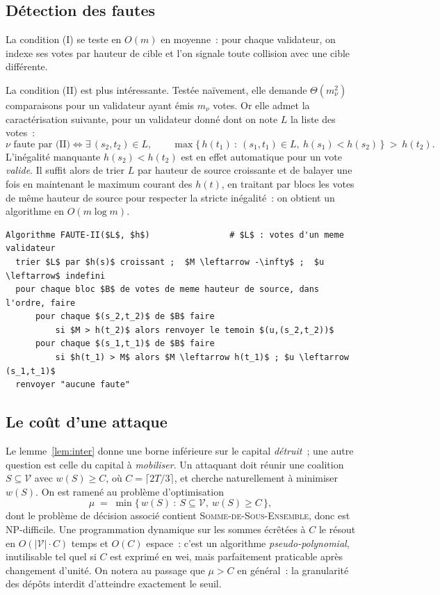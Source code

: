 \documentclass[11pt,a4paper]{article}
\theoremstyle{plain}
\theoremstyle{definition}
\newcommand{\Vv}{\mathcal{V}}
\begin{document}
\subsection{Détection des fautes}

La condition (I) se teste en $O(m)$ en moyenne~: pour chaque validateur, on indexe ses votes
par hauteur de cible et l'on signale toute collision avec une cible différente.

La condition (II) est plus intéressante. Testée naïvement, elle demande $\Theta(m_\nu^2)$
comparaisons pour un validateur ayant émis $m_\nu$ votes. Or elle admet la caractérisation
suivante, pour un validateur donné dont on note $L$ la liste des votes~:
\[ \nu \text{ faute par (II)} \iff \exists\,(s_2,t_2)\in L,\qquad
\max\big\{\,h(t_1)\ :\ (s_1,t_1)\in L,\ h(s_1)<h(s_2)\,\big\}\ >\ h(t_2). \]
L'inégalité manquante $h(s_2)<h(t_2)$ est en effet automatique pour un vote \emph{valide}.
Il suffit alors de trier $L$ par hauteur de source croissante et de balayer une fois en
maintenant le maximum courant des $h(t)$, en traitant par blocs les votes de même hauteur de
source pour respecter la stricte inégalité~: on obtient un algorithme en $O(m\log m)$.

\begin{lstlisting}
Algorithme FAUTE-II($L$, $h$)                # $L$ : votes d'un meme validateur
  trier $L$ par $h(s)$ croissant ;  $M \leftarrow -\infty$ ;  $u \leftarrow$ indefini
  pour chaque bloc $B$ de votes de meme hauteur de source, dans l'ordre, faire
      pour chaque $(s_2,t_2)$ de $B$ faire
          si $M > h(t_2)$ alors renvoyer le temoin $(u,(s_2,t_2))$
      pour chaque $(s_1,t_1)$ de $B$ faire
          si $h(t_1) > M$ alors $M \leftarrow h(t_1)$ ; $u \leftarrow (s_1,t_1)$
  renvoyer "aucune faute"
\end{lstlisting}

\subsection{Le coût d'une attaque}

Le lemme~\ref{lem:inter} donne une borne inférieure sur le capital \emph{détruit}~; une autre
question est celle du capital à \emph{mobiliser}. Un attaquant doit réunir une coalition
$S\subseteq\Vv$ avec $w(S)\ge C$, où $C=\lceil 2T/3\rceil$, et cherche naturellement à
minimiser $w(S)$. On est ramené au problème d'optimisation
\[ \mu \;=\; \min\{\,w(S)\ :\ S\subseteq\Vv,\ w(S)\ge C\,\}, \]
dont le problème de décision associé contient \textsc{Somme-de-Sous-Ensemble}, donc est
NP-difficile. Une programmation dynamique sur les sommes écrêtées à $C$ le résout en
$O(|\Vv|\cdot C)$ temps et $O(C)$ espace~: c'est un algorithme \emph{pseudo-polynomial},
inutilisable tel quel si $C$ est exprimé en wei, mais parfaitement praticable après
changement d'unité. On notera au passage que $\mu>C$ en général~: la granularité des dépôts
interdit d'atteindre exactement le seuil.
\end{document}
